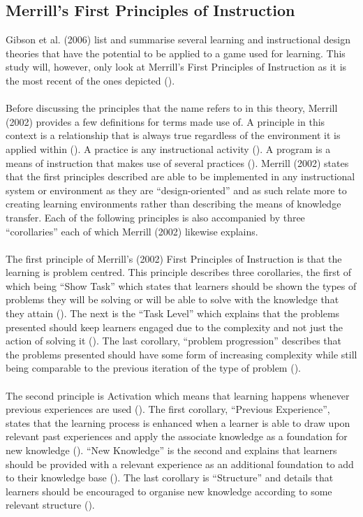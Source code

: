 \subsection{Merrill's First Principles of Instruction}
Gibson et al. (2006) list and summarise several learning and instructional design theories that have the potential to be applied to a game used for learning. This study will, however, only look at 	Merrill’s First Principles of Instruction as it is the most recent of the ones depicted (\cite{gibson2006games}).
\\\\
Before discussing the principles that the name refers to in this theory, Merrill (2002) provides a few definitions for terms made use of. A principle in this context is a relationship that is always true regardless of the environment it is applied within (\cite{Merrill2002}). A practice is any instructional activity (\cite{Merrill2002}). A program is a means of instruction that makes use of several practices (\cite{Merrill2002}). Merrill (2002) states that the first principles described are able to be implemented in any instructional system or environment as they are “design-oriented” and as such relate more to creating learning environments rather than describing the means of knowledge transfer. Each of the following principles is also accompanied by three “corollaries” each of which Merrill (2002) likewise explains.
\\\\
The first principle of Merrill’s (2002) First Principles of Instruction is that the learning is problem centred. This principle describes three corollaries, the first of which being “Show Task” which states that learners should be shown the types of problems they will be solving or will be able to solve with the knowledge that they attain (\cite{Merrill2002}). The next is the “Task Level” which explains that the problems presented should keep learners engaged due to the complexity and not just the action of solving it (\cite{Merrill2002}). The last corollary, “problem progression” describes that the problems presented should have some form of increasing complexity while still being comparable to the previous iteration of the type of problem (\cite{Merrill2002}).
\\\\
The second principle is Activation which means that learning happens whenever previous experiences are used (\cite{Merrill2002}). The first corollary, “Previous Experience”, states that the learning process is enhanced when a learner is able to draw upon relevant past experiences and apply the associate knowledge as a foundation for new knowledge (\cite{Merrill2002}). “New Knowledge” is the second and explains that learners should be provided with a relevant experience as an additional foundation to add to their knowledge base (\cite{Merrill2002}). The last corollary is “Structure” and details that learners should be encouraged to organise new knowledge according to some relevant structure (\cite{Merrill2002}).

